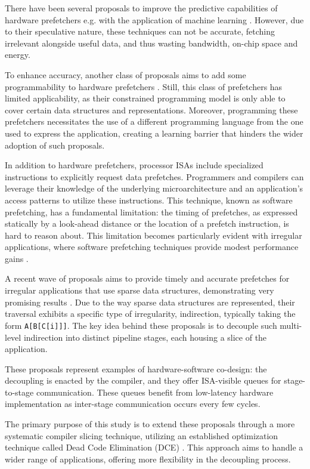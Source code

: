 \documentclass{acaces}
\begin{document}
There have been several proposals to improve the predictive capabilities of hardware prefetchers e.g. with the application of machine learning \cite{bera_pythia_2021}.
However, due to their speculative nature, these techniques can not be accurate, fetching irrelevant alongside useful data, and thus wasting bandwidth, on-chip space and energy.

To enhance accuracy, another class of proposals aims to add some programmability to hardware prefetchers \cite{talati_prodigy_2021}.
Still, this class of prefetchers has limited applicability, as their constrained programming model is only able to cover certain data structures and representations.
Moreover, programming these prefetchers necessitates the use of a different programming language from the one used to express the application,
creating a learning barrier that hinders the wider adoption of such proposals.

In addition to hardware prefetchers, processor ISAs include specialized instructions to explicitly request data prefetches.
Programmers and compilers can leverage their knowledge of the underlying microarchitecture and an application's access patterns to utilize these instructions.
This technique, known as software prefetching, has a fundamental limitation:
the timing of prefetches, as expressed statically by a look-ahead distance or the location of a prefetch instruction, is hard to reason about.
This limitation becomes particularly evident with irregular applications,
where software prefetching techniques provide modest performance gains \cite{ainsworth_software_2018}.

A recent wave of proposals aims to provide timely and accurate prefetches for irregular applications that use sparse data structures,
demonstrating very promising results \cite{manocha_graphattack_2021, Nguyen2023}.
Due to the way sparse data structures are represented,
their traversal exhibits a specific type of irregularity, indirection, typically taking the form \texttt{A[B[C[i]]]}.
The key idea behind these proposals is to decouple such multi-level indirection into distinct pipeline stages, each housing a slice of the application.

These proposals represent examples of hardware-software co-design:
the decoupling is enacted by the compiler, and they offer ISA-visible queues for stage-to-stage communication.
These queues benefit from low-latency hardware implementation as inter-stage communication occurs every few cycles.

The primary purpose of this study is to extend these proposals through a more systematic compiler slicing technique, utilizing an established optimization technique called Dead Code Elimination (DCE) \cite{cytron_efficiently_1991}.
This approach aims to handle a wider range of applications, offering more flexibility in the decoupling process.
\end{document}
